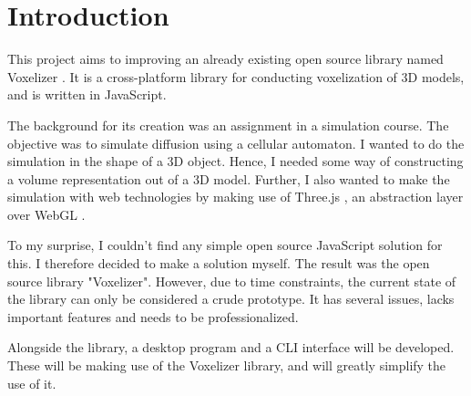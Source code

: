 
\chapter[Introductions]{Introduction}
This project aims to improving an already existing open source \cite{open-source} library named Voxelizer \cite{voxelizer}. It is a cross-platform library for conducting voxelization of 3D models, and is written in JavaScript.

The background for its creation was an assignment in a simulation course. The objective was to simulate diffusion using a cellular automaton. I wanted to do the simulation in the shape of a 3D object. Hence, I needed some way of constructing a volume representation out of a 3D model. Further, I also wanted to make the simulation with web technologies by making use of Three.js \cite{three.js}, an abstraction layer over WebGL \cite{webgl}. 

To my surprise, I couldn’t find any simple open source JavaScript solution for this. I therefore decided to make a solution myself. The result was the open source library "Voxelizer". However, due to time constraints, the current state of the library can only be considered a crude prototype. It has several issues, lacks important features and needs to be professionalized.

Alongside the library, a desktop program and a CLI interface will be developed. These will be making use of the Voxelizer library, and will greatly simplify the use of it.
